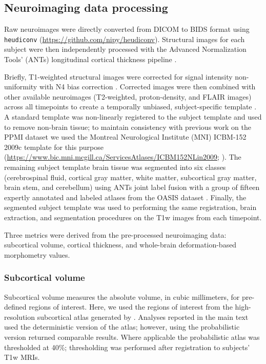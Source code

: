\documentclass[12pt,aps,pra,reprint,showkeys]{revtex4-1}
\begin{document}
\subsection*{Neuroimaging data processing}

Raw neuroimages were directly converted from DICOM to BIDS format \citep{gorgolewski2016brain} using \texttt{heudiconv} (\url{https://github.com/nipy/heudiconv}).
Structural images for each subject were then independently processed with the Advanced Normalization Tools' (ANTs) longitudinal cortical thickness pipeline \citep{tustison2018ants}.

Briefly, T1-weighted structural images were corrected for signal intensity non-uniformity with N4 bias correction \citep{tustison2010n4itk}.
Corrected images were then combined with other available neuroimages (T2-weighted, proton-density, and FLAIR images) across all timepoints to create a temporally unbiased, subject-specific template \citep{avants2010optimal}.
A standard template was non-linearly registered to the subject template and used to remove non-brain tissue; to maintain consistency with previous work on the PPMI dataset \citep{zeighami2015network, yau2017network} we used the Montreal Neurological Institute (MNI) ICBM-152 2009c template for this purpose (\url{https://www.bic.mni.mcgill.ca/ServicesAtlases/ICBM152NLin2009}; \citep{fonov2009unbiased, fonov2011unbiased, collins1999animal}).
The remaining subject template brain tissue was segmented into six classes (cerebrospinal fluid, cortical gray matter, white matter, subcortical gray matter, brain stem, and cerebellum) using ANTs joint label fusion \citep{wang2013multi} with a group of fifteen expertly annotated and labeled atlases from the OASIS dataset \citep{klein2012101}.
Finally, the segmented subject template was used to performing the same registration, brain extraction, and segmentation procedures on the T1w images from each timepoint.

Three metrics were derived from the pre-processed neuroimaging data: subcortical volume, cortical thickness, and whole-brain deformation-based morphometry values.

\subsubsection*{Subcortical volume}

Subcortical volume measures the absolute volume, in cubic millimeters, for pre-defined regions of interest.
Here, we used the regions of interest from the high-resolution subcortical atlas generated by \citep{pauli2018high}.
Analyses reported in the main text used the deterministic version of the atlas; however, using the probabilistic version returned comparable results.
Where applicable the probabilistic atlas was thresholded at 40\%; thresholding was performed after registration to subjects' T1w MRIs.
\end{document}
